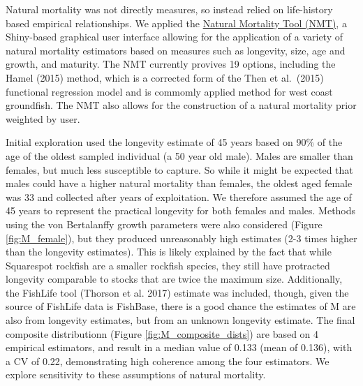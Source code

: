 \documentclass[11pt,
  english,
  a4paper,
]{article}
\begin{document}
Natural mortality was not directly measures, so instead relied on life-history based empirical relationships. We applied the {\href{https://github.com/shcaba/Natural-Mortality-Tool}{Natural Mortality Tool (NMT)}\leavevmode\tagmcend\tagstructend}, a Shiny-based graphical user interface allowing for the application of a variety of natural mortality estimators based on measures such as longevity, size, age and growth, and maturity. The NMT currently provives 19 options, including the Hamel {(2015)\leavevmode\tagmcend\tagstructend} method, which is a corrected form of the Then et al.~{(2015)\leavevmode\tagmcend\tagstructend} functional regression model and is commomly applied method for west coast groundfish. The NMT also allows for the construction of a natural mortality prior weighted by user.

\leavevmode\tagmcend\tagstructend\par


Initial exploration used the longevity estimate of 45 years based on 90\% of the age of the oldest sampled individual (a 50 year old male). Males are smaller than females, but much less susceptible to capture. So while it might be expected that males could have a higher natural mortality than females, the oldest aged female was 33 and collected after years of exploitation. We therefore assumed the age of 45 years to represent the practical longevity for both females and males. Methods using the von Bertalanffy growth parameters were also considered (Figure \ref{fig:M_female}), but they produced unreasonably high estimates (2-3 times higher than the longevity estimates). This is likely explained by the fact that while Squarespot rockfish are a smaller rockfish species, they still have protracted longevity comparable to stocks that are twice the maximum size. Additionally, the FishLife tool {(Thorson et al. 2017)\leavevmode\tagmcend\tagstructend} estimate was included, though, given the source of FishLife data is FishBase, there is a good chance the estimates of M are also from longevity estimates, but from an unknown longevity estimate. The final composite distributionn (Figure \ref{fig:M_composite_dists}) are based on 4 empirical estimators, and result in a median value of 0.133 (mean of 0.136), with a CV of 0.22, demonstrating high coherence among the four estimators. We explore sensitivity to these assumptions of natural mortality.
\end{document}
